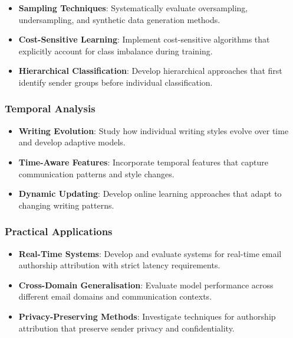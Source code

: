 \documentclass[11pt,a4paper]{article}
\begin{document}
\begin{itemize}
    \item \textbf{Sampling Techniques}: Systematically evaluate oversampling, undersampling, and synthetic data generation methods.
    
    \item \textbf{Cost-Sensitive Learning}: Implement cost-sensitive algorithms that explicitly account for class imbalance during training.
    
    \item \textbf{Hierarchical Classification}: Develop hierarchical approaches that first identify sender groups before individual classification.
\end{itemize}

\subsubsection{Temporal Analysis}

\begin{itemize}
    \item \textbf{Writing Evolution}: Study how individual writing styles evolve over time and develop adaptive models.
    
    \item \textbf{Time-Aware Features}: Incorporate temporal features that capture communication patterns and style changes.
    
    \item \textbf{Dynamic Updating}: Develop online learning approaches that adapt to changing writing patterns.
\end{itemize}

\subsubsection{Practical Applications}

\begin{itemize}
    \item \textbf{Real-Time Systems}: Develop and evaluate systems for real-time email authorship attribution with strict latency requirements.
    
    \item \textbf{Cross-Domain Generalisation}: Evaluate model performance across different email domains and communication contexts.
    
    \item \textbf{Privacy-Preserving Methods}: Investigate techniques for authorship attribution that preserve sender privacy and confidentiality.
\end{itemize}
\end{document}
